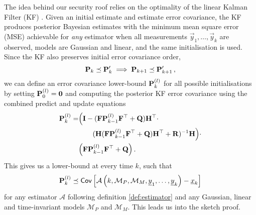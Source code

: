 \documentclass[letterpaper, 10 pt, conference]{IEEEtran}
\theoremstyle{definition}
\begin{document}
The idea behind our security roof relies on the optimality of the linear Kalman Filter (KF) \cite{haugBayesianEstimationTracking}. Given an initial estimate and estimate error covariance, the KF produces posterior Bayesian estimates with the minimum mean square error (MSE) achievable for \textit{any} estimator when all measurements $\vec{y}_1,\dots,\vec{y}_k$ are observed, models are Gaussian and linear, and the same initialisation is used. Since the KF also preserves initial error covariance order,
\begin{equation}
   {\ensuremath{{\mathbf{P}}}}_k \preceq {\ensuremath{{\mathbf{P}}}}_k^\prime \implies {\ensuremath{{\mathbf{P}}}}_{k+1} \preceq {\ensuremath{{\mathbf{P}}}}_{k+1}^\prime\,,
\end{equation}
we can define an error covariance lower-bound ${{\mathbf{P}}}_k^{(l)}$ for all possible initialisations by setting ${{\mathbf{P}}}_0^{(l)} = {{\mathbf{0}}}$ and computing the posterior KF error covariance using the combined predict and update equations
\begin{equation}\label{eqn:lower_bound_error_cov}
   \begin{split}
      \mat{P}_k^{(l)} =& \Bigl( \mat{I} - (\mat{F}\mat{P}_{k-1}^{(l)}\mat{F}^\top + \mat{Q})\mat{H}^\top \cdot \\
      &\qquad(\mat{H}(\mat{F}\mat{P}_{k-1}^{(l)}\mat{F}^\top + \mat{Q})\mat{H}^\top + \mat{R})^{-1}\mat{H}\Bigr)\cdot\\
      &\Bigl(\mat{F}\mat{P}_{k-1}^{(l)}\mat{F}^\top + \mat{Q}\Bigr)\,.
   \end{split}
\end{equation}
This gives us a lower-bound at every time $k$, such that
\begin{equation}
   {\ensuremath{{\mathbf{P}}}}_k^{(l)} \preceq \mathsf{Cov}\left[\mathcal{A}\left(k, \mathcal{M}_P, \mathcal{M}_M, {\underline{y}}_1,\dots,{\underline{y}}_k\right) - {\underline{x}}_k \right]
\end{equation}
for any estimator $\mathcal{A}$ following definition \ref{def:estimator} and any Gaussian, linear and time-invariant models $\mathcal{M}_P$ and $\mathcal{M}_M$. This leads us into the sketch proof.
\end{document}

